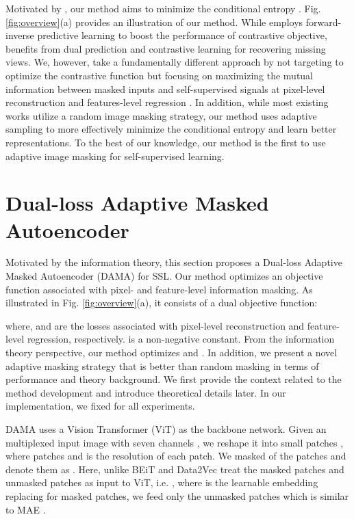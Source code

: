 \documentclass[10pt,twocolumn,letterpaper]{article}
\begin{document}
Motivated by \cite{morency,completer}, our method aims to minimize the conditional entropy .  Fig. \ref{fig:overview}(a) provides an illustration of our method. While \cite{morency} employs forward-inverse predictive learning to boost the performance of contrastive objective, \cite{completer} benefits from dual prediction and contrastive learning for recovering missing views. We, however, take a fundamentally different approach by not targeting to optimize the contrastive function \cite{morency,completer} but focusing on maximizing the mutual information between masked inputs and self-supervised signals at pixel-level reconstruction \cite{mae,beit,simmim} and features-level regression \cite{data2vec}. In addition, while most existing works \cite{mae,beit,simmim,data2vec} utilize a random image masking strategy, our method uses adaptive sampling to more effectively minimize the conditional entropy  and learn better representations. To the best of our knowledge, our method is the first to use adaptive image masking for self-supervised learning.
\section{Dual-loss Adaptive Masked Autoencoder}
\label{sec:method}
Motivated by the information theory, this section proposes a Dual-loss Adaptive Masked Autoencoder (DAMA) for SSL. Our method optimizes an objective function associated with pixel- and feature-level information masking. As illustrated in Fig. \ref{fig:overview}(a), it consists of a dual objective function:

where,  and  are the losses associated with pixel-level reconstruction and feature-level regression, respectively.  is a non-negative constant. From the information theory perspective, our method optimizes  and . In addition, we present a novel adaptive masking strategy that is better than random masking in terms of performance and theory background. We first provide the context related to the method development and introduce theoretical details later. In our implementation, we fixed  for all experiments.

DAMA uses a Vision Transformer (ViT) \cite{vit} as the backbone network. Given an multiplexed input image with seven channels , we reshape it into small patches , where  patches and  is the resolution of each patch. We masked  of the patches and denote them as . Here, unlike BEiT \cite{beit} and Data2Vec \cite{data2vec} treat the masked patches and unmasked patches as input to ViT, i.e. , where  is the learnable embedding replacing for masked patches, we feed only the unmasked patches  which is similar to MAE \cite{mae}.
\end{document}
